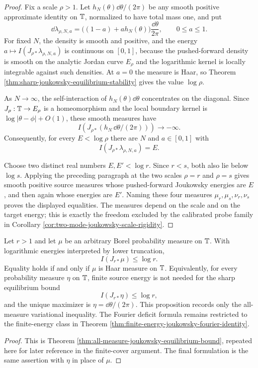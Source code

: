 \begin{proof}
Fix a scale \(\rho>1\).  Let \(h_N(\theta)\dd\theta/(2\pi)\) be any
smooth positive approximate identity on \(\mathbb{T}\), normalized to have
total mass one, and put
\[
\dd\lambda_{\rho,N,a}
=\bigl((1-a)+a h_N(\theta)\bigr)\frac{\dd\theta}{2\pi},
\qquad 0\le a\le1.
\]
For fixed \(N\), the density is smooth and positive, and
the energy \(a\mapsto I(J_{\rho\ast}\lambda_{\rho,N,a})\) is continuous
on \([0,1]\), because the pushed-forward density is smooth on the
analytic Jordan curve \(E_\rho\) and the logarithmic kernel is locally
integrable against such densities.  At \(a=0\) the measure is Haar, so
Theorem \ref{thm:sharp-joukowsky-equilibrium-stability} gives the value
\(\log\rho\).

As \(N\to\infty\), the self-interaction of \(h_N(\theta)\dd\theta\)
concentrates on the diagonal.  Since \(J_\rho:\mathbb{T}\to E_\rho\) is a
homeomorphism and the local boundary kernel is
\(\log|\theta-\phi|+O(1)\), these smooth measures have
\[
I(J_{\rho\ast}(h_N\,\dd\theta/(2\pi)))\longrightarrow -\infty.
\]
Consequently, for every \(E<\log\rho\) there are \(N\) and \(a\in[0,1]\) with
\[
I(J_{\rho\ast}\lambda_{\rho,N,a})=E.
\]

Choose two distinct real numbers \(E,E'<\log r\).  Since \(r<s\), both
also lie below \(\log s\).  Applying the preceding paragraph at the two
scales \(\rho=r\) and \(\rho=s\) gives smooth positive source measures
whose pushed-forward Joukowsky energies are \(E\), and then again whose
energies are \(E'\).  Naming these four measures
\(\mu_r,\mu_s,\nu_r,\nu_s\) proves the displayed equalities.  The
measures depend on the scale and on the target energy; this is exactly
the freedom excluded by the calibrated probe family in Corollary
\ref{cor:two-mode-joukowsky-scale-rigidity}.
\end{proof}

\begin{proposition}\label{prop:extended-energy-joukowsky-equilibrium-bound}
Let \(r>1\) and let \(\mu\) be an arbitrary Borel probability measure on \(\mathbb{T}\).  With logarithmic energies interpreted by lower truncation,
\[
I(J_{r\ast}\mu)\le \log r.
\]
Equality holds if and only if \(\mu\) is Haar measure on \(\mathbb{T}\).  Equivalently, for every probability measure \(\eta\) on \(\mathbb{T}\), finite source energy is not needed for the sharp equilibrium bound
\[
I(J_{r\ast}\eta)\le \log r,
\]
and the unique maximizer is \(\eta=\dd\theta/(2\pi)\).
This proposition records only the all-measure variational inequality.  The
Fourier deficit formula remains restricted to the finite-energy class in
Theorem \ref{thm:finite-energy-joukowsky-fourier-identity}.
\end{proposition}

\begin{proof}
This is Theorem \ref{thm:all-measure-joukowsky-equilibrium-bound},
repeated here for later reference in the finite-cover argument.  The
final formulation is the same assertion with \(\eta\) in place of
\(\mu\).
\end{proof}


